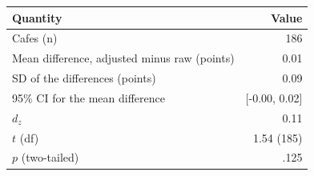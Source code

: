 \begin{tabular}{lr}
\toprule
Quantity & Value \\
\midrule
Cafes (n) & 186 \\
Mean difference, adjusted minus raw (points) & 0.01 \\
SD of the differences (points) & 0.09 \\
95\% CI for the mean difference & [-0.00, 0.02] \\
$d_z$ & 0.11 \\
$t$ (df) & 1.54 (185) \\
$p$ (two-tailed) & .125 \\
\bottomrule
\end{tabular}
